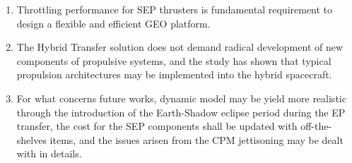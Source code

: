 \begin{enumerate}[label=(\alph*)]
\item Throttling performance for SEP thrusters is fundamental requirement to design a flexible and efficient GEO platform.%
\item The Hybrid Transfer solution does not demand radical development of new components of propulsive systems, and the study has shown that typical propulsion architectures may be implemented into the hybrid spacecraft.
\item For what concerns future works, dynamic model may be yield more realistic through the introduction of the Earth-Shadow eclipse period during the EP transfer, the cost for the SEP components shall be updated with off-the-shelves items, and the issues arisen from the CPM jettisoning may be dealt with in details.
\end{enumerate}